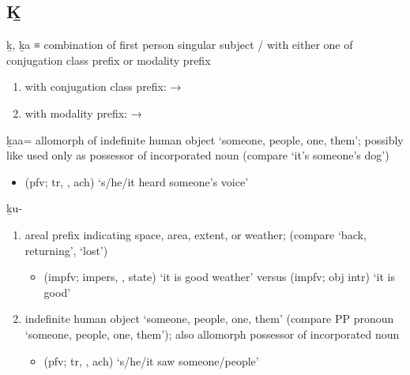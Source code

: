 \documentclass[12pt,letterpaper,oneside,article]{memoir}
\begin{document}
\subsection{Ḵ}\label{sec:alphalist-kh}
\begin{morphdesc}[resume*=alphalist]
\item[ḵ, ḵa]
	≡ 
	combination of first person singular subject  /  with either one of
		 conjugation class prefix
		or  modality prefix
	\begin{enumerate}
	\item	with  conjugation class prefix:  → 
	\item	with  modality prefix:  → 
	\end{enumerate}
	
\item[ḵaa=]
	allomorph of  indefinite human object ‘someone, people, one, them’;
	possibly like  used only as possessor of incorporated noun
		(compare  ‘it’s someone’s dog’)
	\begin{itemize}
	\item	{} (pfv; tr, , ach) ‘s/he/it heard someone’s voice’
	\end{itemize}

\item[ḵu-]
	\begin{enumerate}
	\item	areal prefix indicating space, area, extent, or weather;
		(compare  ‘back, returning’,  ‘lost’)
		\begin{itemize}
		\item	{} (impfv; impers, ,  state) ‘it is good weather’\newline
			versus  (impfv; obj intr) ‘it is good’
		\end{itemize}
	\item	indefinite human object ‘someone, people, one, them’
		(compare PP pronoun  ‘someone, people, one, them’);
		also allomorph  possessor of incorporated noun
		\begin{itemize}
		\item	{} (pfv; tr, , ach) ‘s/he/it saw someone/people’
		\end{itemize}
	\end{enumerate}
\end{morphdesc}
\end{document}
